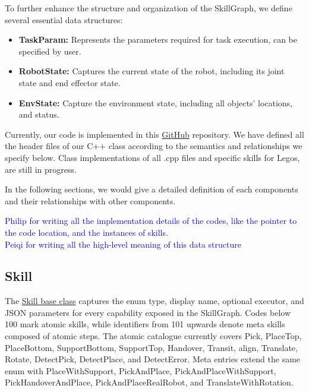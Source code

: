 \documentclass{article}
\newcommand{\assignee}[1]{\textcolor{blue}{#1}}
\begin{document}
To further enhance the structure and organization of the SkillGraph, we define several essential data structures:
\begin{itemize}
    \item \textbf{TaskParam:} Represents the parameters required for task execution, can be specified by user.
    \item \textbf{RobotState:} Captures the current state of the robot, including its joint state and end effector state.
    \item \textbf{EnvState:} Capture the environment state, including all objects' locations, and status.
\end{itemize}

Currently, our code is implemented in this \href{https://github.com/intelligent-control-lab/AIDF}{GitHub} repository. We have defined all the header files of our C++ class according to the semantics and relationships we specify below. Class implementations of all .cpp files and specific skills for Legos, are still in progress. 

In the following sections, we would give a detailed definition of each components and their relationships with other components.

\assignee{Philip for writing all the implementation details of the codes, like the pointer to the code location, and the instances of skills.}\\
\assignee{Peiqi for writing all the high-level meaning of this data structure}
\subsection{Skill}\label{sec:skills}
The \href{https://github.com/intelligent-control-lab/AIDF/blob/main/skillgraph/api/skills.hpp#L10}{Skill base class} captures the enum type, display name, optional executor, and JSON parameters for every capability exposed in the SkillGraph. Codes below 100 mark atomic skills, while identifiers from 101 upwards denote meta skills composed of atomic steps. The atomic catalogue currently covers Pick, PlaceTop, PlaceBottom, SupportBottom, SupportTop, Handover, Transit, align, Translate, Rotate, DetectPick, DetectPlace, and DetectError. Meta entries extend the same enum with PlaceWithSupport, PickAndPlace, PickAndPlaceWithSupport, PickHandoverAndPlace, PickAndPlaceRealRobot, and TranslateWithRotation.
\end{document}
